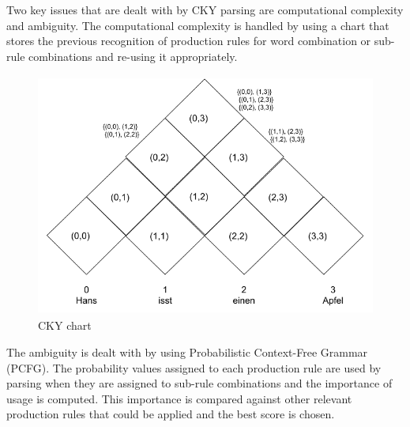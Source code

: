 \documentclass[a4paper, 11pt]{article}
\begin{document}
Two key issues that are dealt with by CKY parsing are computational complexity and ambiguity. The computational complexity is handled by using a chart that stores the previous recognition of production rules for word combination or sub-rule combinations and re-using it appropriately. 

\begin{figure}[H]
    \centering
    \includegraphics[width=\textwidth,height=8cm, keepaspectratio=true]
    {cky-parsing-chart-1.png}
    \caption{
        CKY chart
    }
    \label{fig:cky_parser_1}
\end{figure}

The ambiguity is dealt with by using Probabilistic Context-Free Grammar (PCFG). The probability values assigned to each production rule are used by parsing when they are assigned to sub-rule combinations and the importance of usage is computed. This importance is compared against other relevant production rules that could be applied and the best score is chosen.
\end{document}
